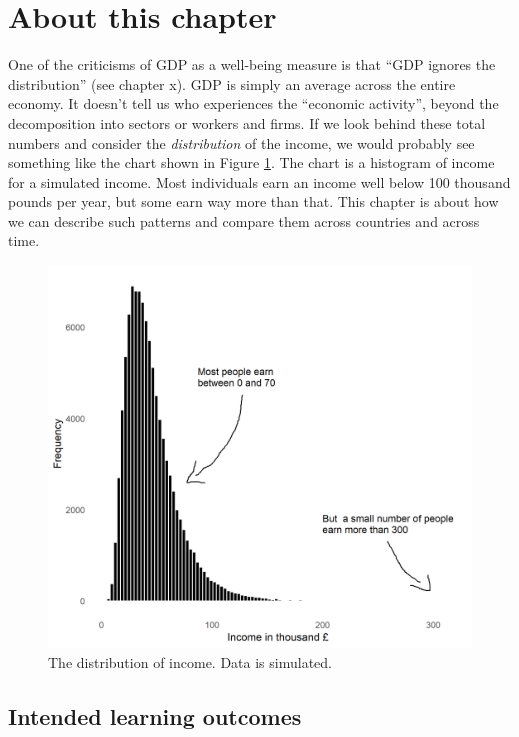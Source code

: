 \documentclass[]{book}
\begin{document}
\hypertarget{about-this-chapter-6}{%
\section{About this chapter}\label{about-this-chapter-6}}

One of the criticisms of GDP as a well-being measure is that ``GDP ignores the distribution'' (see chapter x). GDP is simply an average across the entire economy. It doesn't tell us who experiences the ``economic activity'', beyond the decomposition into sectors or workers and firms. If we look behind these total numbers and consider the \emph{distribution} of the income, we would probably see something like the chart shown in Figure \ref{fig:in0}. The chart is a histogram of income for a simulated income. Most individuals earn an income well below 100 thousand pounds per year, but some earn way more than that. This chapter is about how we can describe such patterns and compare them across countries and across time.

\begin{figure}

{\centering \includegraphics[width=0.85\linewidth]{_resources/chapter_inequality/hist2} 

}

\caption{The distribution of income. Data is simulated.}\label{fig:in0}
\end{figure}

\hypertarget{intended-learning-outcomes-5}{%
\subsection{Intended learning outcomes}\label{intended-learning-outcomes-5}}
\end{document}
